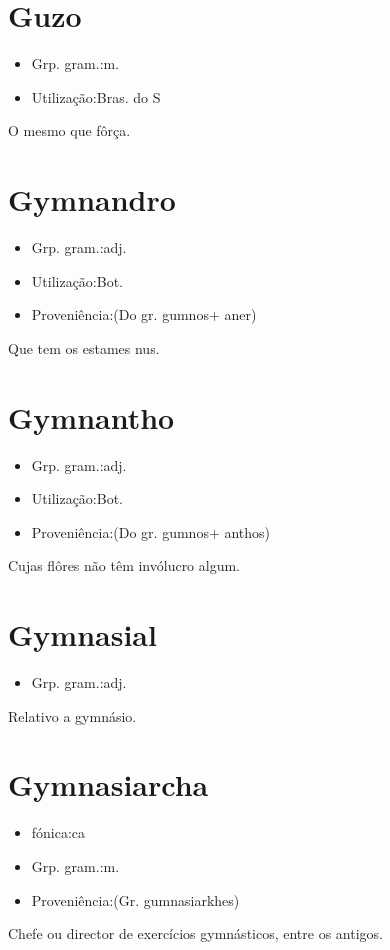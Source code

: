 \section{Guzo}
\begin{itemize}
\item {Grp. gram.:m.}
\end{itemize}
\begin{itemize}
\item {Utilização:Bras. do S}
\end{itemize}
O mesmo que \textunderscore fôrça\textunderscore .
\section{Gymnandro}
\begin{itemize}
\item {Grp. gram.:adj.}
\end{itemize}
\begin{itemize}
\item {Utilização:Bot.}
\end{itemize}
\begin{itemize}
\item {Proveniência:(Do gr. \textunderscore gumnos\textunderscore  + \textunderscore aner\textunderscore )}
\end{itemize}
Que tem os estames nus.
\section{Gymnantho}
\begin{itemize}
\item {Grp. gram.:adj.}
\end{itemize}
\begin{itemize}
\item {Utilização:Bot.}
\end{itemize}
\begin{itemize}
\item {Proveniência:(Do gr. \textunderscore gumnos\textunderscore  + \textunderscore anthos\textunderscore )}
\end{itemize}
Cujas flôres não têm invólucro algum.
\section{Gymnasial}
\begin{itemize}
\item {Grp. gram.:adj.}
\end{itemize}
Relativo a gymnásio.
\section{Gymnasiarcha}
\begin{itemize}
\item {fónica:ca}
\end{itemize}
\begin{itemize}
\item {Grp. gram.:m.}
\end{itemize}
\begin{itemize}
\item {Proveniência:(Gr. \textunderscore gumnasiarkhes\textunderscore )}
\end{itemize}
Chefe ou director de exercícios gymnásticos, entre os antigos.
